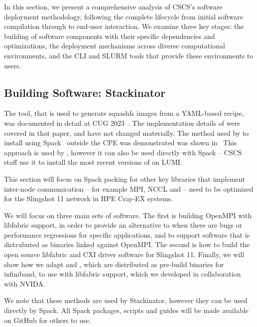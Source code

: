 In this section, we present a comprehensive analysis of CSCS's software deployment methodology, following the complete lifecycle from initial software compilation through to end-user interaction.
We examine three key stages: the building of software components with their specific dependencies and optimizations, the deployment mechanisms across diverse computational environments, and the CLI and SLURM tools that provide these environments to users.

\subsection{Building Software: Stackinator}

The  \stackinator tool, that is used to generate squashfs images from a YAML-based recipe, was documented in detail at CUG 2023~\cite{uenv2023}.
The implementation details of \stackinator were covered in that paper, and have not changed materially.
The method used by \stackinator to install \craympich using Spack~\cite{gamblin:sc15} outside the CPE was demonstrated was shown in~\cite{uenv2023} 
This approach is used by \stackinator, however it can also be used directly with Spack -- CSCS staff use it to install the most recent versions of \craympich on LUMI.

This section will focus on Spack packing for other key libraries that implement inter-node communication -- for example MPI, NCCL and \nvshmem -- need to be optimized for the Slingshot 11 network in HPE Cray-EX systems.

We will focus on three main sets of software. The first is building OpenMPI with libfabric support, in order to provide an alternative to \craympich when there are bugs or performance regressions for specific applications, and to support software that is distrubuted as binaries linked against OpenMPI. The second is how to build the open source libfabric and CXI driver software for Slingshot 11. Finally, we will show how we adapt \cufftmp and \cusolvermp, which are distributed as pre-build binaries for infiniband, to use \nvshmem with libfabric support, which we developed in collaboration with NVIDA.

We note that these methods are used by Stackinator, however they can be used directly by Spack. All Spack packages, scripts and guides will be made available on GitHub for others to use.

